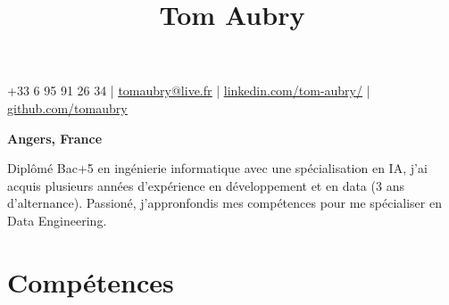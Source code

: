 \documentclass{article}
\title{Tom Aubry}
\date{}
\begin{document}
\maketitle
\thispagestyle{empty} %
\vspace{-6,5em}

\begin{center}
+33 6 95 91 26 34 | \href{mailto:tomaubry@live.fr}{\underline{tomaubry@live.fr}} | \href{www.linkedin.com/in/tom-aubry-85b024209}{\underline{linkedin.com/tom-aubry/}} | \href{ https://github.com/tomaubry}{\underline{github.com/tomaubry}}
\end{center}
\begin{center}
\textbf{Angers, France}
\end{center}


\begin{center}
Diplômé Bac+5 en ingénierie informatique avec une spécialisation en IA, j’ai acquis plusieurs années d’expérience en développement et en data (3 ans d’alternance). Passioné, j'appronfondis mes compétences pour me spécialiser en Data Engineering.
\end{center}

\section*{Compétences}
\end{document}
